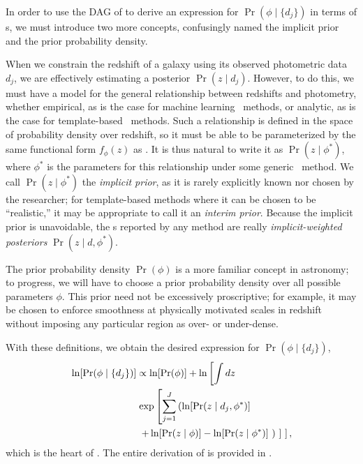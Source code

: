 In order to use the DAG of  to derive an expression for $\Pr(\phi \mid \{d_{j}\})$ in terms of \pzpdf s, we must introduce two more concepts, confusingly named the implicit prior and the prior probability density.

When we constrain the redshift of a galaxy using its observed photometric data $d_{j}$, we are effectively estimating a posterior $\Pr(z \mid d_{j})$.
However, to do this, we must have a model for the general relationship between redshifts and photometry, whether empirical, as is the case for machine learning \pzpdf\ methods, or analytic, as is the case for template-based \pzpdf\ methods.
Such a relationship is defined in the space of probability density over redshift, so it must be able to be parameterized by the same functional form $f_{\phi}(z)$ as \nz .
It is thus natural to write it as $\Pr(z \mid \phi^{*})$, where $\phi^{*}$ is the parameters for this relationship under some generic \pzpdf\ method.
We call $\Pr(z \mid \phi^{*})$ the \textit{implicit prior}, as it is rarely explicitly known nor chosen by the researcher; for template-based methods where it can be chosen to be ``realistic,'' it may be appropriate to call it an \textit{interim prior}.
Because the implicit prior is unavoidable, the \pzpdf s reported by any method are really \textit{implicit-weighted posteriors} $\Pr(z \mid d, \phi^{*})$.

The prior probability density $\Pr(\phi)$ is a more familiar concept in astronomy; to progress, we will have to choose a prior probability density over all possible parameters $\phi$.
This prior need not be excessively proscriptive; for example, it may be chosen to enforce smoothness at physically motivated scales in redshift without imposing any particular region as over- or under-dense.

With these definitions, we obtain the desired expression for $\Pr(\phi \mid \{d_{j}\})$,
\begin{align}
\begin{split}
\eqlabel{eqn:fullpost}
\ln[\Pr(\phi \mid \{d_{j}\})] & \propto \ln[\Pr(\phi)] + \ln \left[\int dz \right.\\
& \left. \exp \left[\sum_{j=1}^{J} \left(\ln[\Pr(z \mid d_{j}, \phi^{*})] \right. \right. \right.\\
& \left. \left. \left. + \ln[\Pr(z \mid \phi)] - \ln[\Pr(z \mid \phi^{*})]\ \right)\ \right]\ \right] ,
\end{split}
\end{align}
which is the heart of \chippr.
The entire derivation of  is provided in .


